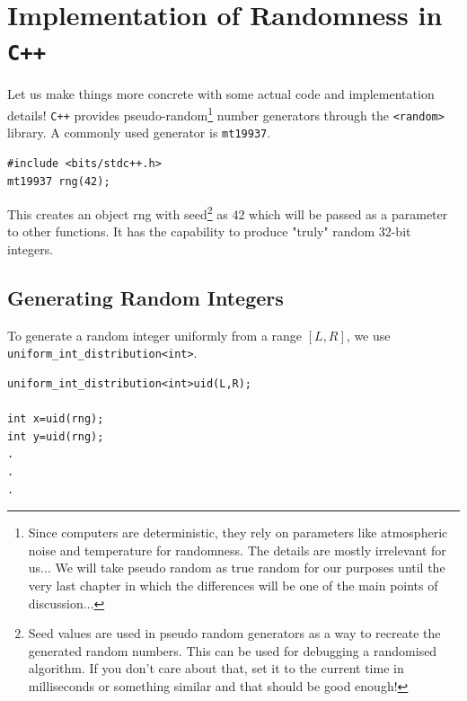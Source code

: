 \section{Implementation of Randomness in \texttt{C++}}

Let us make things more concrete with some actual code and implementation details! \texttt{C++} 
provides pseudo-random\footnote{Since computers are deterministic, they rely on parameters like 
atmospheric noise and temperature for randomness. The details are mostly irrelevant for us... We will 
take pseudo random as true random for our purposes until the very last chapter in which the differences will be 
one of the main points of discussion$\dots$} 
number generators through the \texttt{<random>} library. A commonly used generator is \texttt{mt19937}.

\begin{center}
\begin{minipage}{0.9\linewidth}
\begin{framed}
\begin{Verbatim}
#include <bits/stdc++.h>
mt19937 rng(42);
\end{Verbatim}
\vspace{-4mm}
\end{framed}
\end{minipage}
\end{center}

This creates an object rng with seed\footnote{Seed values are used in pseudo random generators as a way 
to recreate the generated random numbers. This can be used for debugging a randomised algorithm. If 
you don't care about that, set it to the current time in milliseconds or something 
similar and that should be good enough!} as 42 which will be passed as a 
parameter to other functions. It has the capability to produce "truly" random 32-bit integers.

\subsection*{Generating Random Integers}

To generate a random integer uniformly from a range \([L,R]\), we use \texttt{uniform\_int\_distribution<int>}.

\begin{center}
\begin{minipage}{0.9\linewidth}
\begin{framed}
\begin{Verbatim}
uniform_int_distribution<int>uid(L,R);

int x=uid(rng);
int y=uid(rng);
.
.
.
\end{Verbatim}
\vspace{-4mm}
\end{framed}
\end{minipage}
\end{center}

